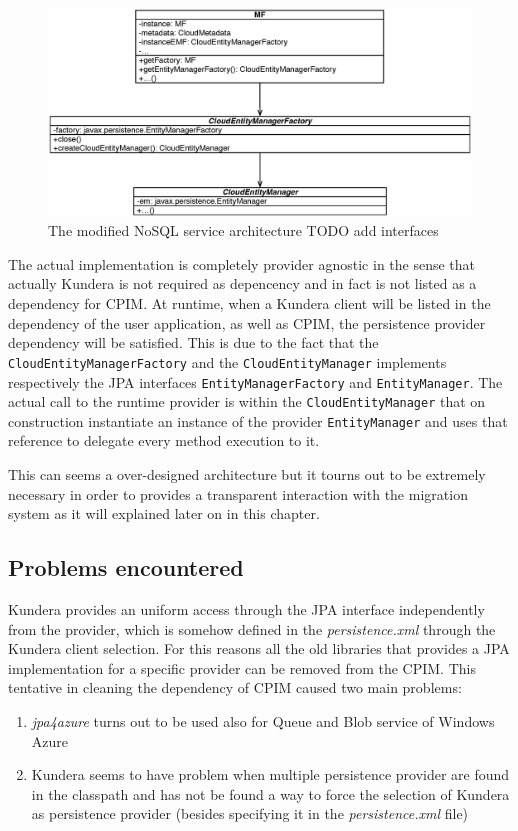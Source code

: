 \begin{figure}[tbh]
  \centering
  \includegraphics[width=14cm]{images/cpim_nosql_kundera}
  \caption{The modified NoSQL service architecture TODO add interfaces}
  \label{fig:cpim-kundera}
\end{figure}

\noindent The actual implementation is completely provider agnostic in the sense that actually Kundera is not required as depencency and in fact is not listed as a dependency for CPIM. At runtime, when a Kundera client will be listed in the dependency of the user application, as well as CPIM, the persistence provider dependency will be satisfied.
This is due to the fact that the \texttt{CloudEntityManagerFactory} and the \texttt{CloudEntityManager} implements respectively the JPA interfaces  \texttt{EntityManagerFactory}  and \texttt{EntityManager}.
The actual call to the runtime provider is within the \texttt{CloudEntityManager} that on construction instantiate an instance of the provider \texttt{EntityManager} and uses that reference to delegate every method execution to it.

\noindent This can seems a over-designed architecture but it tourns out to be extremely necessary in order to provides a transparent interaction with the migration system as it will explained later on in this chapter.

\subsection{Problems encountered}
Kundera provides an uniform access through the JPA interface independently from the provider, which is somehow defined in the \textit{persistence.xml} through the Kundera client selection. For this reasons all the old libraries that provides a JPA implementation for a specific provider can be removed from the CPIM. 
This tentative in cleaning the dependency of CPIM caused two main problems:
\begin{enumerate}
\item \textit{jpa4azure} turns out to be used also for Queue and Blob service of Windows Azure
\item Kundera seems to have problem when multiple persistence provider are found in the classpath and has not be found a way to force the selection of Kundera as persistence provider (besides specifying it in the \textit{persistence.xml} file)
\end{enumerate} 

